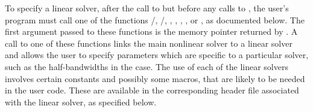 To specify a {\kinsol} linear solver, after the call to 
but before any calls to , the user's program must call one of
the functions /, /,
, , , , or
, as documented below. 
The first argument passed to these functions is the {\kinsol}
memory pointer returned by . A call to one of these
functions links the main {\kinsol} nonlinear solver to a linear solver and
allows the user to specify parameters which are specific to a
particular solver, such as the half-bandwidths in the {\kinband} case.
The use of each of the linear solvers involves certain constants and possibly 
some macros, that are likely to be needed in the user code.  These are
available in the corresponding header file associated with the linear
solver, as specified below.


